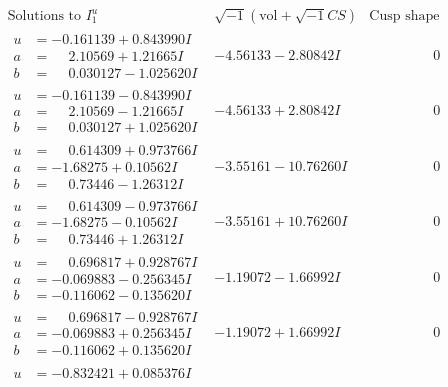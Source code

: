 \documentclass[1p]{elsarticle_modified}
\theoremstyle{definition}
\newcommand{\I}{\sqrt{-1}}
\begin{document}
$$\begin{array}{c|c|c}
\text{Solutions to }I^u_{1}& \I (\text{vol} + \sqrt{-1}CS) & \text{Cusp shape}\\
 \hline 
\begin{aligned}
u &= -0.161139 + 0.843990 I \\
a &= \phantom{-}2.10569 + 1.21665 I \\
b &= \phantom{-}0.030127 - 1.025620 I\end{aligned}
 & -4.56133 - 2.80842 I & \phantom{-0.000000 } 0 \\ \hline\begin{aligned}
u &= -0.161139 - 0.843990 I \\
a &= \phantom{-}2.10569 - 1.21665 I \\
b &= \phantom{-}0.030127 + 1.025620 I\end{aligned}
 & -4.56133 + 2.80842 I & \phantom{-0.000000 } 0 \\ \hline\begin{aligned}
u &= \phantom{-}0.614309 + 0.973766 I \\
a &= -1.68275 + 0.10562 I \\
b &= \phantom{-}0.73446 - 1.26312 I\end{aligned}
 & -3.55161 - 10.76260 I & \phantom{-0.000000 } 0 \\ \hline\begin{aligned}
u &= \phantom{-}0.614309 - 0.973766 I \\
a &= -1.68275 - 0.10562 I \\
b &= \phantom{-}0.73446 + 1.26312 I\end{aligned}
 & -3.55161 + 10.76260 I & \phantom{-0.000000 } 0 \\ \hline\begin{aligned}
u &= \phantom{-}0.696817 + 0.928767 I \\
a &= -0.069883 - 0.256345 I \\
b &= -0.116062 - 0.135620 I\end{aligned}
 & -1.19072 - 1.66992 I & \phantom{-0.000000 } 0 \\ \hline\begin{aligned}
u &= \phantom{-}0.696817 - 0.928767 I \\
a &= -0.069883 + 0.256345 I \\
b &= -0.116062 + 0.135620 I\end{aligned}
 & -1.19072 + 1.66992 I & \phantom{-0.000000 } 0 \\ \hline\begin{aligned}
u &= -0.832421 + 0.085376 I \\

\end{aligned}
\end{array}$$
\end{document}
